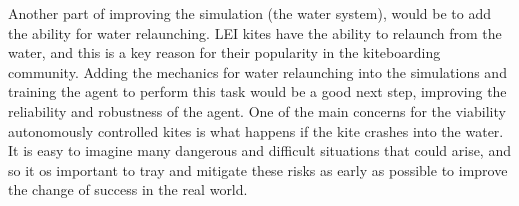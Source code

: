 Another part of improving the simulation (the water system), would be to add the ability for water relaunching. LEI kites have the ability to relaunch from the water, and this is a key reason for their popularity in the kiteboarding community. Adding the mechanics for water relaunching into the simulations and training the agent to perform this task would be a good next step, improving the reliability and robustness of the agent. One of the main concerns for the viability autonomously controlled kites is what happens if the kite crashes into the water. It is easy to imagine many dangerous and difficult situations that could arise, and so it os important to tray and mitigate these risks as early as possible to improve the change of success in the real world.